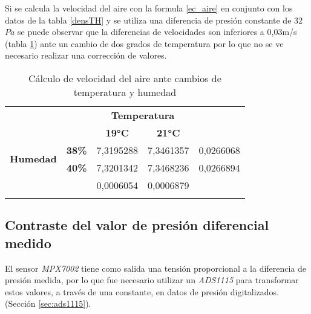 Si se calcula la velocidad del aire con la formula \ref{ec_aire} en conjunto con los datos de la tabla \ref{densTH} y se utiliza una diferencia de presión constante de 32$Pa$ se puede observar que la diferencias de velocidades son inferiores a 0,03m/s (tabla \ref{velTH}) ante un cambio de dos grados de temperatura por lo que no se ve necesario realizar una corrección de valores.


\begin{table}[H]
	\centering
	\begin{tabular}{ll|l|l|l|} 
		\cline{3-4}
		&                                    & \multicolumn{2}{c|}{\textbf{Temperatura}}                                                     & \multicolumn{1}{l}{}                           \\ 
		\cline{3-4}
		&                                    & \multicolumn{1}{c|}{\textbf{19°C}}            & \multicolumn{1}{c|}{\textbf{21°C}}            & \multicolumn{1}{c}{\textbf{}}                  \\ 
		\hline
		\multicolumn{1}{|c|}{\multirow{2}{*}{\textbf{Humedad}}} & \multicolumn{1}{r|}{\textbf{38\%}} & 7,3195288                                     & 7,3461357                                     & {\cellcolor[rgb]{0.816,0.816,0.816}}0,0266068  \\ 
		\hhline{|~----|}
		\multicolumn{1}{|c|}{}                                  & \multicolumn{1}{r|}{\textbf{40\%}} & 7,3201342                                     & 7,3468236                                     & {\cellcolor[rgb]{0.816,0.816,0.816}}0,0266894  \\ 
		\hline
		& \multicolumn{1}{c|}{\textbf{}}     & {\cellcolor[rgb]{0.816,0.816,0.816}}0,0006054 & {\cellcolor[rgb]{0.816,0.816,0.816}}0,0006879 & \multicolumn{1}{l}{}                           \\
		\hhline{~~--~}
	\end{tabular}
	\caption{Cálculo de velocidad del aire ante cambios de temperatura y humedad}
	\label{velTH}
\end{table}

\subsection{Contraste del valor de presión diferencial medido}

El sensor \textit{MPX7002} tiene como salida una tensión proporcional a la diferencia de presión medida, por lo que fue necesario utilizar un \textit{ADS1115} para transformar estos valores, a través de una constante, en datos de presión digitalizados. (Sección \ref{sec:ads1115}).

